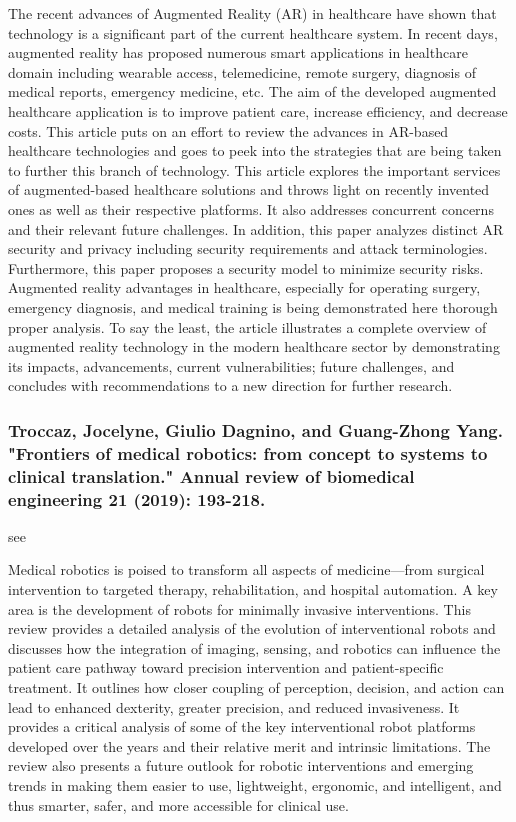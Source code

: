 \documentclass[conference]{IEEEtran}
\begin{document}
The recent advances of Augmented Reality (AR) in healthcare have shown that technology is a significant part of the current healthcare system. In recent days, augmented reality has proposed numerous smart applications in healthcare domain including wearable access, telemedicine, remote surgery, diagnosis of medical reports, emergency medicine, etc. The aim of the developed augmented healthcare application is to improve patient care, increase efficiency, and decrease costs. This article puts on an effort to review the advances in AR-based healthcare technologies and goes to peek into the strategies that are being taken to further this branch of technology. This article explores the important services of augmented-based healthcare solutions and throws light on recently invented ones as well as their respective platforms. It also addresses concurrent concerns and their relevant future challenges. In addition, this paper analyzes distinct AR security and privacy including security requirements and attack terminologies. Furthermore, this paper proposes a security model to minimize security risks. Augmented reality advantages in healthcare, especially for operating surgery, emergency diagnosis, and medical training is being demonstrated here thorough proper analysis. To say the least, the article illustrates a complete overview of augmented reality technology in the modern healthcare sector by demonstrating its impacts, advancements, current vulnerabilities; future challenges, and concludes with recommendations to a new direction for further research.


\medskip
\subsubsection{Troccaz, Jocelyne, Giulio Dagnino, and Guang-Zhong Yang. "Frontiers of medical robotics: from concept to systems to clinical translation." Annual review of biomedical engineering 21 (2019): 193-218.}
see \cite{troccaz2019frontiers}

Medical robotics is poised to transform all aspects of medicine—from surgical intervention to targeted therapy, rehabilitation, and hospital automation. A key area is the development of robots for minimally invasive interventions. This review provides a detailed analysis of the evolution of interventional robots and discusses how the integration of imaging, sensing, and robotics can influence the patient care pathway toward precision intervention and patient-specific treatment. It outlines how closer coupling of perception, decision, and action can lead to enhanced dexterity, greater precision, and reduced invasiveness. It provides a critical analysis of some of the key interventional robot platforms developed over the years and their relative merit and intrinsic limitations. The review also presents a future outlook for robotic interventions and emerging trends in making them easier to use, lightweight, ergonomic, and intelligent, and thus smarter, safer, and more accessible for clinical use.
\end{document}
